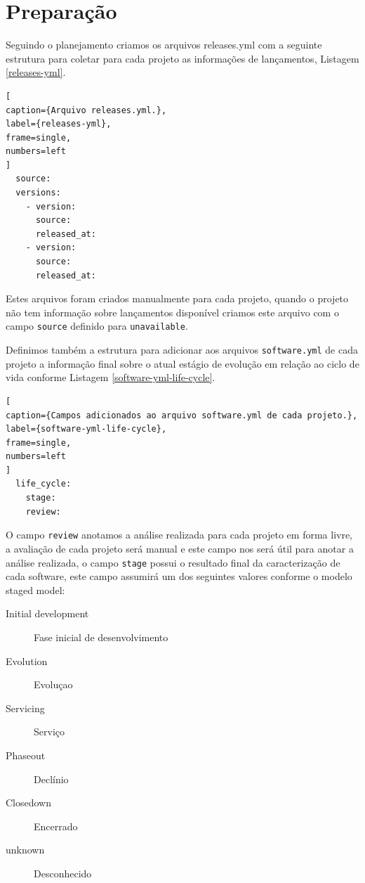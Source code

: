 
\section{Preparação} \label{estudo3:preparacao}

Seguindo o planejamento criamos os arquivos releases.yml com a seguinte
estrutura para coletar para cada projeto as informações de lançamentos,
Listagem \ref{releases-yml}.

\begin{lstlisting}[
caption={Arquivo releases.yml.},
label={releases-yml},
frame=single,
numbers=left
]
  source:
  versions:
    - version:
      source:
      released_at:
    - version:
      source:
      released_at:
\end{lstlisting}

Estes arquivos foram criados manualmente para cada projeto, quando o projeto
não tem informação sobre lançamentos disponível criamos este arquivo com o campo
\texttt{source} definido para \texttt{unavailable}.

Definimos também a estrutura para adicionar aos arquivos \texttt{software.yml} de
cada projeto a informação final sobre o atual estágio de evolução em relação ao
ciclo de vida conforme Listagem \ref{software-yml-life-cycle}.

\begin{lstlisting}[
caption={Campos adicionados ao arquivo software.yml de cada projeto.},
label={software-yml-life-cycle},
frame=single,
numbers=left
]
  life_cycle:
    stage:
    review:
\end{lstlisting}

O campo \texttt{review} anotamos a análise realizada para cada projeto em forma
livre, a avaliação de cada projeto será manual e este campo nos será útil para
anotar a análise realizada, o campo \texttt{stage} possui o resultado final da
caracterização de cada software, este campo assumirá um dos seguintes valores
conforme o modelo staged model:

\begin{description}
  \item [Initial development] Fase inicial de desenvolvimento
  \item [Evolution] Evoluçao
  \item [Servicing] Serviço
  \item [Phaseout] Declínio
  \item [Closedown] Encerrado
  \item [unknown] Desconhecido
\end{description}

